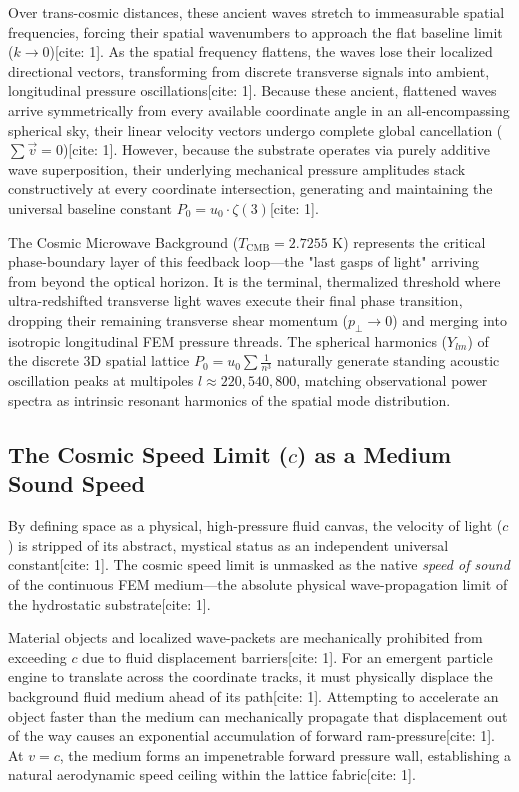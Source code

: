 \documentclass[11pt,a4paper]{article}
\begin{document}
	Over trans-cosmic distances, these ancient waves stretch to immeasurable spatial frequencies, forcing their spatial wavenumbers to approach the flat baseline limit ($k \rightarrow 0$)[cite: 1]. As the spatial frequency flattens, the waves lose their localized directional vectors, transforming from discrete transverse signals into ambient, longitudinal pressure oscillations[cite: 1]. Because these ancient, flattened waves arrive symmetrically from every available coordinate angle in an all-encompassing spherical sky, their linear velocity vectors undergo complete global cancellation ($\sum \vec{v} = 0$)[cite: 1]. However, because the substrate operates via purely additive wave superposition, their underlying mechanical pressure amplitudes stack constructively at every coordinate intersection, generating and maintaining the universal baseline constant $P_0 = u_0 \cdot \zeta(3)$[cite: 1].
	
	The Cosmic Microwave Background ($T_{\text{CMB}} = 2.7255\text{ K}$) represents the critical phase-boundary layer of this feedback loop—the "last gasps of light" arriving from beyond the optical horizon. It is the terminal, thermalized threshold where ultra-redshifted transverse light waves execute their final phase transition, dropping their remaining transverse shear momentum ($p_\perp \to 0$) and merging into isotropic longitudinal FEM pressure threads. The spherical harmonics ($Y_{lm}$) of the discrete 3D spatial lattice $P_0 = u_0 \sum \frac{1}{n^3}$ naturally generate standing acoustic oscillation peaks at multipoles $l \approx 220, 540, 800$, matching observational power spectra as intrinsic resonant harmonics of the spatial mode distribution.
	
	\subsection{\texorpdfstring{The Cosmic Speed Limit ($c$) as a Medium Sound Speed}{The Cosmic Speed Limit (c) as a Medium Sound Speed}}
	By defining space as a physical, high-pressure fluid canvas, the velocity of light ($c$) is stripped of its abstract, mystical status as an independent universal constant[cite: 1]. The cosmic speed limit is unmasked as the native \textit{speed of sound} of the continuous FEM medium—the absolute physical wave-propagation limit of the hydrostatic substrate[cite: 1].
	
	Material objects and localized wave-packets are mechanically prohibited from exceeding $c$ due to fluid displacement barriers[cite: 1]. For an emergent particle engine to translate across the coordinate tracks, it must physically displace the background fluid medium ahead of its path[cite: 1]. Attempting to accelerate an object faster than the medium can mechanically propagate that displacement out of the way causes an exponential accumulation of forward ram-pressure[cite: 1]. At $v = c$, the medium forms an impenetrable forward pressure wall, establishing a natural aerodynamic speed ceiling within the lattice fabric[cite: 1].
	
\end{document}
